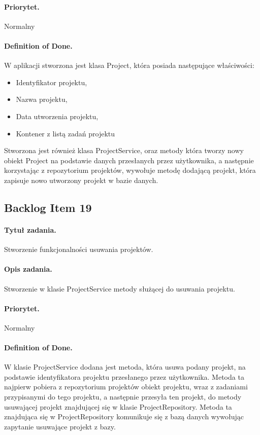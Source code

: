 \documentclass[a4paper]{article}
\begin{document}
\paragraph{Priorytet.} Normalny
\paragraph{Definition of Done.} W aplikacji stworzona jest klasa Project, która posiada następujące właściwości:
\begin{itemize}
\item Identyfikator projektu, 
\item Nazwa projektu, 
\item Data utworzenia projektu,
\item Kontener z listą zadań projektu
\end{itemize}
Stworzona jest również klasa ProjectService, oraz metody która tworzy nowy obiekt Project na podstawie danych przesłanych przez użytkownika, a następnie korzystając z repozytorium projektów, wywołuje metodę dodającą projekt, która zapisuje nowo utworzony projekt w bazie danych. 

\subsection{Backlog Item 19} 
\paragraph{Tytuł zadania.}  Stworzenie funkcjonalności usuwania projektów.
\paragraph{Opis zadania.} Stworzenie w klasie ProjectService metody służącej do usuwania projektu. 
\paragraph{Priorytet.} Normalny
\paragraph{Definition of Done.} W klasie ProjectService dodana jest metoda, która usuwa podany projekt, na podstawie identyfikatora projektu przesłanego 
przez użytkownika. Metoda ta najpierw pobiera z repozytorium projektów obiekt projektu, wraz z zadaniami przypisanymi do tego projektu, a następnie przesyła ten projekt, do metody usuwającej projekt znajdującej się w klasie ProjectRepository. Metoda ta znajdująca się w ProjectRepository komunikuje się z bazą danych wywołując zapytanie usuwające projekt z bazy. 
\end{document}

